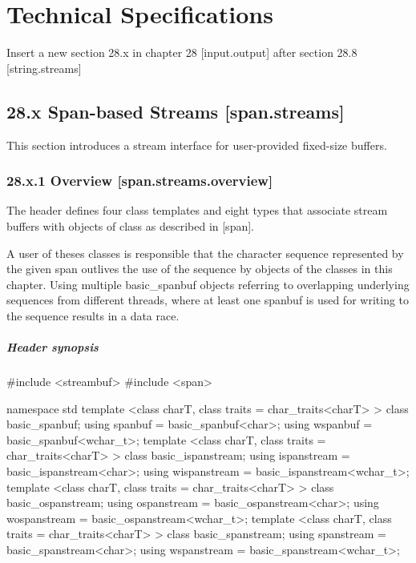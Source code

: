 \documentclass[ebook,11pt,article]{memoir}
\begin{document}
\chapter{Technical Specifications}

Insert a new section 28.x in chapter 28 [input.output] after section 28.8 [string.streams]

\section{28.x Span-based Streams [span.streams]}
This section introduces a stream interface for user-provided fixed-size buffers. 
\subsection{28.x.1 Overview [span.streams.overview]}
The header  defines four class templates and eight types that associate stream buffers with objects of class  as described in [span]. 
\begin{note}
A user of theses classes is responsible that the character sequence represented by the given span outlives the use of the sequence by objects of the classes in this chapter. Using multiple basic_spanbuf objects referring to overlapping underlying sequences from different threads, where at least one spanbuf is used for writing to the sequence results in a data race.
\end{note}

\paragraph{Header  synopsis}

\begin{codeblock}
#include <streambuf>
#include <span>

namespace std {
  template <class charT, class traits = char_traits<charT> >
    class basic_spanbuf;
  using spanbuf = basic_spanbuf<char>;
  using wspanbuf = basic_spanbuf<wchar_t>;
  template <class charT, class traits = char_traits<charT> >
    class basic_ispanstream;
  using ispanstream = basic_ispanstream<char>;
  using wispanstream = basic_ispanstream<wchar_t>;
  template <class charT, class traits = char_traits<charT> >
    class basic_ospanstream;
  using ospanstream = basic_ospanstream<char>;
  using wospanstream = basic_ospanstream<wchar_t>;
  template <class charT, class traits = char_traits<charT> >
    class basic_spanstream;
  using spanstream = basic_spanstream<char>;
  using wspanstream = basic_spanstream<wchar_t>;
}
\end{codeblock}
\end{document}
